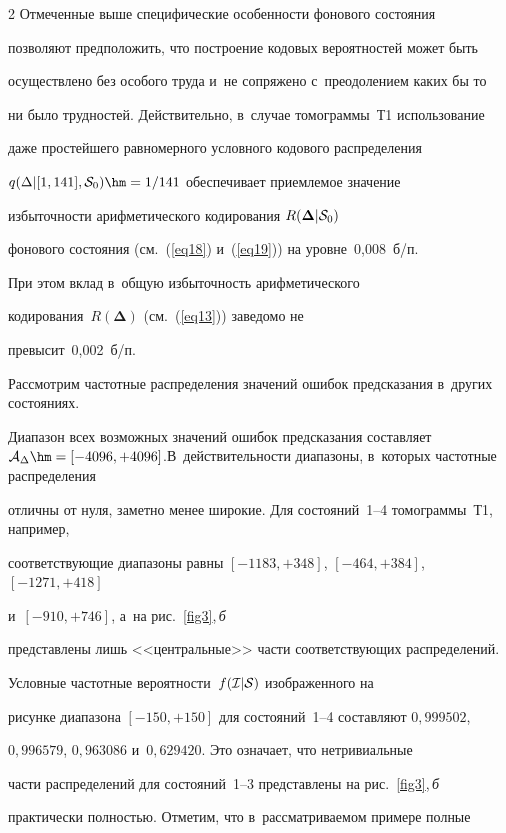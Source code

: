 \begin{multicols}{2}
Отмеченные выше специфические особенности фонового состояния 

позволяют предположить, что построение кодовых вероятностей может быть 

осуществлено без особого труда и~не сопряжено с~преодолением каких бы то 

ни было трудностей. Действительно, в~случае томограммы~Т1 использование 

даже простейшего равномерного условного кодового распределения 

$q(\Delta|[1,141],{\cal S}_0)\hm=1/141$ обеспечивает приемлемое значение 

избыточности арифметического кодирования $R(\boldsymbol{\Delta}|{\cal S}_0)$ 

фонового состояния (см.~(\ref{eq18}) и~(\ref{eq19})) на уровне~0,008~б/п. 

При этом вклад в~общую избыточность арифметического 

кодирования~$R(\boldsymbol{\Delta})$ (см.~(\ref{eq13})) заведомо не 

превысит~0,002~б/п.



Рассмотрим частотные распределения значений ошибок предсказания в~других состояниях. 

Диа\-пазон всех возможных значений ошибок пред\-сказания составляет ${\cal A}_{\Delta}\hm= 

[-4096,+4096]$.\linebreak В~действительности диапазоны, в~которых частот\-ные распределения 

отличны от нуля, заметно менее широкие. Для состояний~1--4 томограммы~Т1, например, 

соответствующие диапазоны равны $[-1183,+348]$, $[-464,+384]$, $[-1271,+418]$ 

и~$[-910,+746]$, а~на рис.~\ref{fig3},\,\textit{б} 

представлены лишь <<центральные>> час\-ти соответствующих распределений. 

Условные частотные вероятности~$f({\cal I}|{\cal S})$ изображенного на 

рисунке диапазона $[-150,+150]$ для состояний~1--4 составляют $0{,}999502$, 

$0{,}996579$, $0{,}963086$ и~$0{,}629420$. Это означает, что нетривиальные 

части распределений для состояний~1--3 представлены на рис.~\ref{fig3},\,\textit{б} 

практически полностью. Отметим, что в~рас\-смат\-ри\-ва\-емом примере полные 


\end{multicols}
